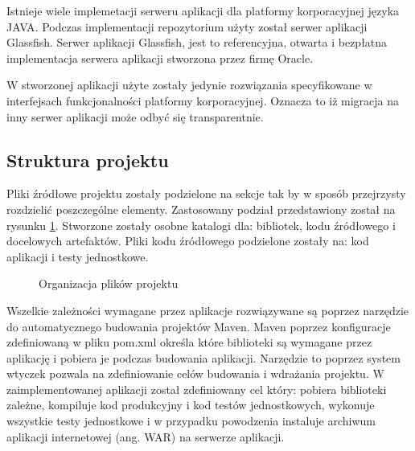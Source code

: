 Istnieje wiele implemetacji serweru aplikacji dla platformy korporacyjnej języka JAVA. Podczas implementacji repozytorium użyty został serwer aplikacji Glassfish. Serwer aplikacji Glassfish, jest to referencyjna, otwarta i bezpłatna implementacja serwera aplikacji stworzona przez firmę Oracle. 

W stworzonej aplikacji użyte zostały jedynie rozwiązania specyfikowane w interfejsach funkcjonalności platformy korporacyjnej. Oznacza to iż migracja na inny serwer aplikacji może odbyć się transparentnie.
\subsection{Struktura projektu}
Pliki źródłowe projektu zostały podzielone na sekcje tak by w sposób przejrzysty rozdzielić poszczególne elementy. Zastosowany podział przedstawiony został na rysunku \ref{fig:stukturaProjektu}. Stworzone zostały osobne katalogi dla: bibliotek, kodu źródłowego i docelowych artefaktów. Pliki kodu źródłowego podzielone zostały na: kod aplikacji i testy jednostkowe.

\begin{figure}[h!]

\caption{Organizacja plików projektu}
\label{fig:stukturaProjektu}
\end{figure}

Wszelkie zależności wymagane przez aplikacje rozwiązywane są poprzez narzędzie do automatycznego budowania projektów Maven. Maven poprzez konfiguracje zdefiniowaną w pliku pom.xml określa które biblioteki są wymagane przez aplikację i pobiera je podczas budowania aplikacji. Narzędzie to poprzez system wtyczek pozwala na zdefiniowanie celów budowania i wdrażania projektu. W zaimplementowanej aplikacji został zdefiniowany cel który: pobiera biblioteki zależne, kompiluje kod produkcyjny i kod testów jednostkowych, wykonuje wszystkie testy jednostkowe i w przypadku powodzenia instaluje archiwum aplikacji internetowej (ang. WAR) na serwerze aplikacji.


